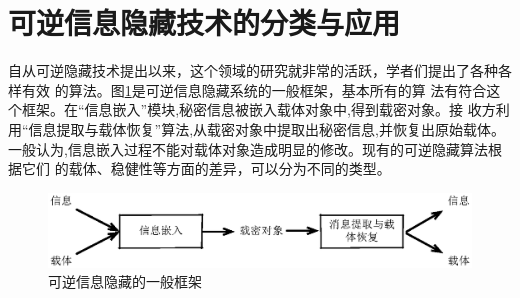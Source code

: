 \section{可逆信息隐藏技术的分类与应用}
\label{s:type_application_reversible_data_hiding}
自从可逆隐藏技术提出以来，这个领域的研究就非常的活跃，学者们提出了各种各样有效
的算法。图\ref{fig:revers_framework}是可逆信息隐藏系统的一般框架，基本所有的算
法有符合这个框架。在``信息嵌入''模块,秘密信息被嵌入载体对象中,得到载密对象。接
收方利用``信息提取与载体恢复''算法,从载密对象中提取出秘密信息,并恢复出原始载体。
一般认为,信息嵌入过程不能对载体对象造成明显的修改。现有的可逆隐藏算法根据它们
的载体、稳健性等方面的差异，可以分为不同的类型。
\par
\begin{figure}[!ht]
\centering 
\includegraphics{figures/reversible_framework.eps}
\caption{可逆信息隐藏的一般框架}
\label{fig:revers_framework}
\end{figure}

